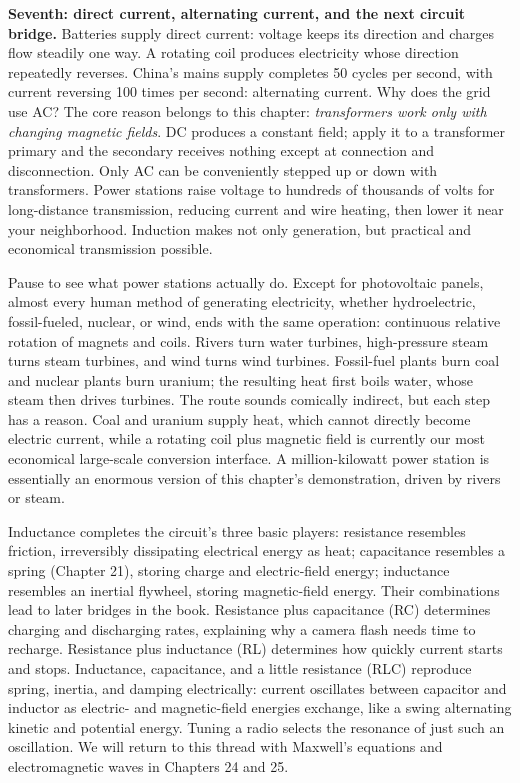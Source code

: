 \textbf{Seventh: direct current, alternating current, and the next circuit bridge.} Batteries supply direct current: voltage keeps its direction and charges flow steadily one way. A rotating coil produces electricity whose direction repeatedly reverses. China's mains supply completes 50 cycles per second, with current reversing 100 times per second: alternating current. Why does the grid use AC? The core reason belongs to this chapter: \emph{transformers work only with changing magnetic fields}. DC produces a constant field; apply it to a transformer primary and the secondary receives nothing except at connection and disconnection. Only AC can be conveniently stepped up or down with transformers. Power stations raise voltage to hundreds of thousands of volts for long-distance transmission, reducing current and wire heating, then lower it near your neighborhood. Induction makes not only generation, but practical and economical transmission possible.

Pause to see what power stations actually do. Except for photovoltaic panels, almost every human method of generating electricity, whether hydroelectric, fossil-fueled, nuclear, or wind, ends with the same operation: continuous relative rotation of magnets and coils. Rivers turn water turbines, high-pressure steam turns steam turbines, and wind turns wind turbines. Fossil-fuel plants burn coal and nuclear plants burn uranium; the resulting heat first boils water, whose steam then drives turbines. The route sounds comically indirect, but each step has a reason. Coal and uranium supply heat, which cannot directly become electric current, while a rotating coil plus magnetic field is currently our most economical large-scale conversion interface. A million-kilowatt power station is essentially an enormous version of this chapter's demonstration, driven by rivers or steam.

Inductance completes the circuit's three basic players: resistance resembles friction, irreversibly dissipating electrical energy as heat; capacitance resembles a spring (Chapter 21), storing charge and electric-field energy; inductance resembles an inertial flywheel, storing magnetic-field energy. Their combinations lead to later bridges in the book. Resistance plus capacitance (RC) determines charging and discharging rates, explaining why a camera flash needs time to recharge. Resistance plus inductance (RL) determines how quickly current starts and stops. Inductance, capacitance, and a little resistance (RLC) reproduce spring, inertia, and damping electrically: current oscillates between capacitor and inductor as electric- and magnetic-field energies exchange, like a swing alternating kinetic and potential energy. Tuning a radio selects the resonance of just such an oscillation. We will return to this thread with Maxwell's equations and electromagnetic waves in Chapters 24 and 25.


